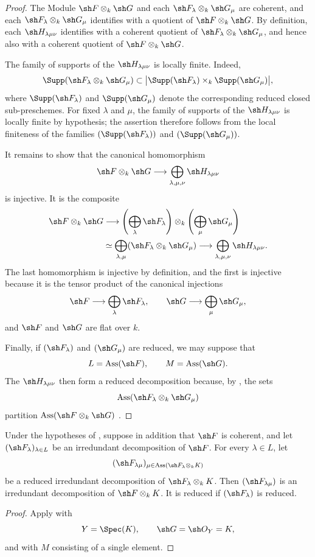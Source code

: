 \begin{proof}
The Module $\sh F\otimes_k\sh G$ and each
$\sh F_\lambda\otimes_k\sh G_\mu$ are coherent, and each
$\sh F_\lambda\otimes_k\sh G_\mu$ identifies with a quotient of
$\sh F\otimes_k\sh G$.
By definition, each $\sh H_{\lambda\mu\nu}$ identifies with a coherent
quotient of $\sh F_\lambda\otimes_k\sh G_\mu$, and hence also with a
coherent quotient of $\sh F\otimes_k\sh G$.

The family of supports of the $\sh H_{\lambda\mu\nu}$ is locally finite.
Indeed,
\[
\Supp(\sh F_\lambda\otimes_k\sh G_\mu)
\subset
\bigl|\Supp(\sh F_\lambda)\times_k\Supp(\sh G_\mu)\bigr|,
\]
where $\Supp(\sh F_\lambda)$ and $\Supp(\sh G_\mu)$ denote the
corresponding reduced closed sub-preschemes.
For fixed $\lambda$ and $\mu$, the family of supports of the
$\sh H_{\lambda\mu\nu}$ is locally finite by hypothesis; the assertion
therefore follows from the local finiteness of the families
$(\Supp(\sh F_\lambda))$ and $(\Supp(\sh G_\mu))$.

It remains to show that the canonical homomorphism
\[
\sh F\otimes_k\sh G
\longrightarrow
\bigoplus_{\lambda,\mu,\nu}\sh H_{\lambda\mu\nu}
\]
is injective.
It is the composite
\[
\begin{aligned}
\sh F\otimes_k\sh G
&\longrightarrow
\left(\bigoplus_\lambda\sh F_\lambda\right)
\otimes_k
\left(\bigoplus_\mu\sh G_\mu\right)
\\
&\simeq
\bigoplus_{\lambda,\mu}
(\sh F_\lambda\otimes_k\sh G_\mu)
\longrightarrow
\bigoplus_{\lambda,\mu,\nu}\sh H_{\lambda\mu\nu}.
\end{aligned}
\]
The last homomorphism is injective by definition, and the first is
injective because it is the tensor product of the canonical injections
\[
\sh F\longrightarrow\bigoplus_\lambda\sh F_\lambda,
\qquad
\sh G\longrightarrow\bigoplus_\mu\sh G_\mu,
\]
and $\sh F$ and $\sh G$ are flat over $k$.

Finally, if $(\sh F_\lambda)$ and $(\sh G_\mu)$ are reduced, we may
suppose that
\[
L=\operatorname{Ass}(\sh F),
\qquad
M=\operatorname{Ass}(\sh G).
\]
The $\sh H_{\lambda\mu\nu}$ then form a reduced decomposition because,
by , the sets
\[
\operatorname{Ass}(\sh F_\lambda\otimes_k\sh G_\mu)
\]
partition
$\operatorname{Ass}(\sh F\otimes_k\sh G)$
.
\end{proof}

\begin{corollary}[4.2.10]
\label{IV.4.2.10}
Under the hypotheses of , suppose in addition that
$\sh F$ is coherent, and let
$(\sh F_\lambda)_{\lambda\in L}$ be an irredundant decomposition of
$\sh F$.
For every $\lambda\in L$, let
\[
(\sh F_{\lambda\mu})_{
  \mu\in\operatorname{Ass}(\sh F_\lambda\otimes_k K)}
\]
be a reduced irredundant decomposition of
$\sh F_\lambda\otimes_k K$.
Then $(\sh F_{\lambda\mu})$ is an irredundant decomposition of
$\sh F\otimes_k K$.
It is reduced if $(\sh F_\lambda)$ is reduced.
\end{corollary}

\begin{proof}
Apply  with
\[
Y=\Spec(K),
\qquad
\sh G=\sh O_Y=K,
\]
and with $M$ consisting of a single element.
\end{proof}
